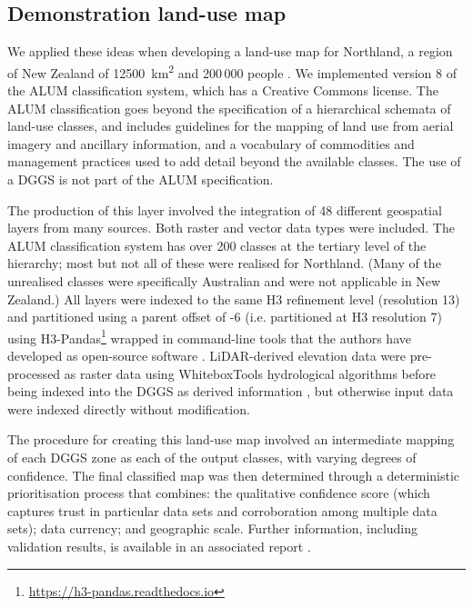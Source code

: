 \documentclass[]{interact}
\theoremstyle{plain}%
\theoremstyle{definition}
\theoremstyle{remark}
\begin{document}
\subsection{Demonstration land-use map}

We applied these ideas when developing a land-use map for Northland, a region of New Zealand of \qty{12500}{\km\squared} and 200\,000 people \citep[see][]{law2023}. We implemented version 8 of the \ac{ALUM} classification system, which has a Creative Commons license. The \ac{ALUM} classification goes beyond the specification of a hierarchical schemata of land-use classes, and includes guidelines for the mapping of land use from aerial imagery and ancillary information, and a vocabulary of commodities and management practices used to add detail beyond the available classes. The use of a \ac{DGGS} is not part of the \ac{ALUM} specification.

The production of this layer involved the integration of 48 different geospatial layers from many sources. Both raster and vector data types were included. The \ac{ALUM} classification system has over 200 classes at the tertiary level of the hierarchy; most but not all of these were realised for Northland. (Many of the unrealised classes were specifically Australian and were not applicable in New Zealand.) All layers were indexed to the same H3 refinement level (resolution 13) and partitioned using a parent offset of -6 (i.e. partitioned at H3 resolution 7) using H3-Pandas\footnote{\url{https://h3-pandas.readthedocs.io}} wrapped in command-line tools that the authors have developed as open-source software \citep{raster2dggs,vector2dggs}. \acs{LiDAR}-derived elevation data were pre-processed as raster data using WhiteboxTools hydrological algorithms before being indexed into the \ac{DGGS} as derived information \citep{lindsay2018whiteboxtools}, but otherwise input data were indexed directly without modification.

The procedure for creating this land-use map involved an intermediate mapping of each \ac{DGGS} zone as each of the output classes, with varying degrees of confidence. The final classified map was then determined through a deterministic prioritisation process that combines: the qualitative confidence score (which captures trust in particular data sets and corroboration among multiple data sets); data currency; and geographic scale. Further information, including validation results, is available in an associated report \citep{law2023}.
\end{document}
